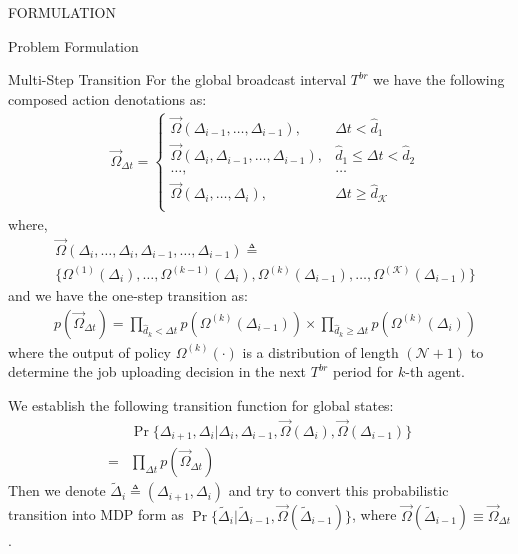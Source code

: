 \documentclass[10pt, conference, letterpaper]{IEEEtran}
\begin{document}
\begin{section}{FORMULATION}
\begin{subsection}{Problem Formulation}
\begin{subsubsection}{Multi-Step Transition}
                For the global broadcast interval $T^{br}$ we have the following composed action denotations as:
                \begin{align}
                    &\vec{\Omega}_{\Delta{t}} = 
                    \begin{cases}
                        \vec{\Omega}(\Delta_{i-1}, \dots, \Delta_{i-1}), & \Delta{t} < \hat{d}_1 \\
                        \vec{\Omega}(\Delta_{i},\Delta_{i-1}, \dots, \Delta_{i-1}), & \hat{d}_1 \leq \Delta{t}< \hat{d}_2 \\
                        \dots, & \dots \\
                        \vec{\Omega}(\Delta_{i}, \dots, \Delta_{i}), & \Delta{t} \geq \hat{d}_{\mathcal{K}} \\
                    \end{cases}
                \end{align}
                where,
                \begin{align}
                    &\vec{\Omega}(\Delta_{i}, \dots, \Delta_{i}, \Delta_{i-1}, \dots, \Delta_{i-1}) \triangleq \nonumber\\
                    & \{\Omega^{(1)}(\Delta_{i}), \dots, \Omega^{(k-1)}(\Delta_{i}),\Omega^{(k)}(\Delta_{i-1}), \dots, \Omega^{(\mathcal{K})}(\Delta_{i-1})\}
                \end{align}
                and we have the one-step transition as:
                \begin{align}
                    & p(\vec{\Omega}_{\Delta{t}})
                    = \prod_{\hat{d}_k<\Delta{t}}{ p(\Omega^{(k)}(\Delta_{i-1})) }
                            \times
                            \prod_{\hat{d}_k\geq\Delta{t}}{ p(\Omega^{(k)}(\Delta_{i})) }
                \end{align}
                where the output of policy $\Omega^{(k)}(\cdot)$ is a distribution of length $(\mathcal{N}+1)$ to determine the job uploading decision in the next $T^{br}$ period for $k$-th agent.

                We establish the following transition function for global states:
                \begin{align}
                    & \Pr\{\Delta_{i+1}, \Delta_{i} | \Delta_{i}, \Delta_{i-1}, \vec{\Omega}(\Delta_i), \vec{\Omega}(\Delta_{i-1})\} \nonumber\\
                    = & \prod_{\Delta{t}} p(\vec{\Omega}_{\Delta{t}})
                \end{align}
                Then we denote $\tilde{\Delta}_{i} \triangleq (\Delta_{i+1}, \Delta_{i})$ and try to convert this probabilistic transition into MDP form as $\Pr\{ \tilde{\Delta}_i | \tilde{\Delta}_{i-1}, \vec{\Omega}(\tilde{\Delta}_{i-1}) \}$, where $\vec{\Omega}(\tilde{\Delta}_{i-1}) \equiv \vec{\Omega}_{\Delta{t}}$.
            \end{subsubsection}


\end{subsection}
\end{section}
\end{document}
